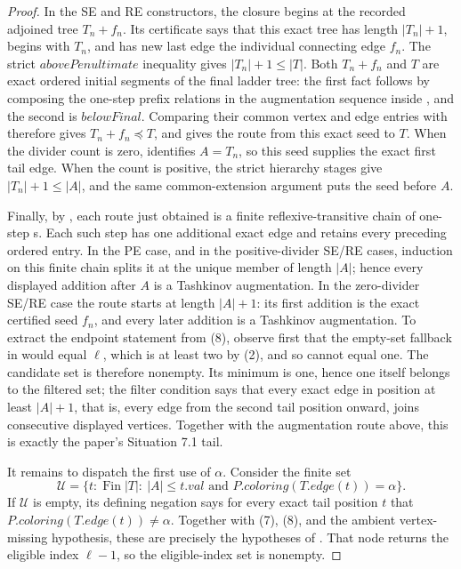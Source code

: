 \begin{proof}
In the SE and RE constructors, the closure begins at the recorded
adjoined tree \(T_n+f_n\).  Its
 certificate says that this exact tree
has length \(|T_n|+1\), begins with \(T_n\), and has new last edge the
individual connecting edge \(f_n\).  The strict
\(\mathit{abovePenultimate}\) inequality gives
\(|T_n|+1\leq |T|\).  Both \(T_n+f_n\) and \(T\) are exact ordered
initial segments of the final ladder tree: the first fact follows by
composing the one-step prefix relations in the augmentation sequence
inside , and the second is
\(\mathit{belowFinal}\).  Comparing their common vertex and edge entries
with  therefore gives
\(T_n+f_n\preccurlyeq T\), and
 gives the route from this
exact seed to \(T\).  When the divider count is zero,
 identifies \(A=T_n\), so this seed supplies the
exact first tail edge.  When the count is positive, the strict hierarchy
stages give \(|T_n|+1\leq |A|\), and the same common-extension argument
puts the seed before \(A\).

Finally, by , each route just
obtained is a finite reflexive-transitive chain of one-step
s.  Each such step has one additional
exact edge and retains every preceding ordered entry.  In the PE case,
and in the positive-divider SE/RE cases, induction on this finite chain
splits it at the unique member of length \(|A|\); hence every displayed
addition after \(A\) is a Tashkinov augmentation.  In the zero-divider
SE/RE case the route starts at length \(|A|+1\): its first addition is
the exact certified seed \(f_n\), and every later addition is a
Tashkinov augmentation.
To extract the endpoint statement from (8), observe first that the
empty-set fallback in  would equal
\(\ell\), which is at least two by (2), and so cannot equal one.
The candidate set is therefore nonempty.  Its minimum is one, hence one
itself belongs to the filtered set; the filter condition says that every
exact edge in position at least \(|A|+1\), that is, every edge from the
second tail position onward, joins consecutive displayed vertices.
Together with the augmentation route above, this is exactly the paper's
Situation 7.1 tail.

It remains to dispatch the first use of \(\alpha\).  Consider the finite
set
\[
 \mathcal U=\{t:\operatorname{Fin}|T|:\ |A|\leq t.\mathit{val}
       \text{ and }P.\mathit{coloring}(T.\mathit{edge}(t))
                    =\alpha\}.
\]
If \(\mathcal U\) is empty, its defining negation says for every exact
tail position \(t\) that
\(P.\mathit{coloring}(T.\mathit{edge}(t))\ne\alpha\).
Together with (7), (8), and the ambient vertex-missing hypothesis, these
are precisely the hypotheses of
.  That node returns the
eligible index \(\ell-1\), so the eligible-index set is nonempty.


\end{proof}
